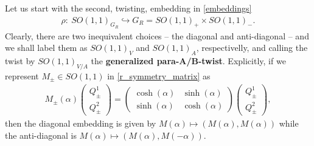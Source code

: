 \documentclass{article}
\newcommand{\RR}{\mathbb{R}}
\newcommand{\QQ}{\mathcal{Q}}
\theoremstyle{definition}
\theoremstyle{remark}
\def\brian{\textcolor{blue}{BM: }\textcolor{blue}}
\def\david{\textcolor{red}{DB: }\textcolor{red}}
\begin{document}
%
\bigskip
Let us start with the second, twisting, embedding in \eqref{embeddings}
\begin{align*}
\rho:\ SO(1,1)_{G_R}\hookrightarrow G_R=SO(1,1)_+\times SO(1,1)_-.
\end{align*}
Clearly, there are two inequivalent choices -- the diagonal and anti-diagonal -- and we shall label them as $SO(1,1)_V$ and $SO(1,1)_A$, respectivelly, and  calling the twist by $SO(1,1)_{V/A}$ the {\bf generalized para-A/B-twist}. Explicitly, if we represent $M_\pm\in SO(1,1)$ in \eqref{r_symmetry_matrix} as
\begin{align*}
 M_\pm(\alpha)\begin{pmatrix}
 Q^1_\pm\\
 Q^2_\pm
 \end{pmatrix}=\begin{pmatrix}
 \cosh(\alpha) & \sinh(\alpha) \\
 \sinh(\alpha) & \cosh(\alpha)
 \end{pmatrix}
 \begin{pmatrix}
 Q^1_\pm\\
 Q^2_\pm
 \end{pmatrix},
 \end{align*}
then the diagonal embedding is given by $M(\alpha) \mapsto (M(\alpha),M(\alpha))$ while the anti-diagonal is $M(\alpha) \mapsto (M(\alpha),M(-\alpha))$.
\end{document}
